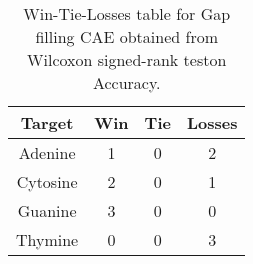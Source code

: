 \begin{table}[H]
\centering
\begin{tabular}{|c|c|c|c|}

\textbf{Target} &  \textbf{Win} &  \textbf{Tie} &  \textbf{Losses} \\
\hline

        Adenine &             1 &             0 &                2 \\
\hline
       Cytosine &             2 &             0 &                1 \\
\hline
        Guanine &             3 &             0 &                0 \\
\hline
        Thymine &             0 &             0 &                3 \\
\hline

\end{tabular}
\caption{Win-Tie-Losses table for Gap filling CAE obtained from Wilcoxon signed-rank teston Accuracy.}
\label{tab:gap_filling_cae_nucleotides_comparison}
\end{table}